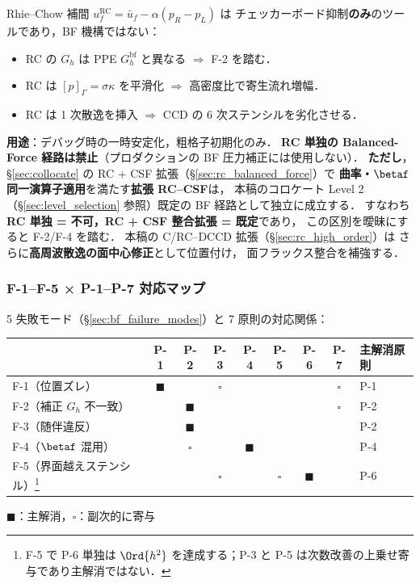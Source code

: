 Rhie--Chow 補間 $u_f^\text{RC}=\bar u_f - \alpha(p_R-p_L)$ は
チェッカーボード抑制\textbf{のみ}のツールであり，BF 機構ではない：
\begin{itemize}[noitemsep]
  \item RC の $G_h$ は PPE $G_h^\text{bf}$ と異なる $\Rightarrow$ F-2 を踏む．
  \item RC は $[p]_\Gamma=\sigma\kappa$ を平滑化 $\Rightarrow$ 高密度比で寄生流れ増幅．
  \item RC は 1 次散逸を挿入 $\Rightarrow$ CCD の 6 次ステンシルを劣化させる．
\end{itemize}
\textbf{用途}：デバッグ時の一時安定化，粗格子初期化のみ．
\textbf{RC 単独の Balanced-Force 経路は禁止}（プロダクションの BF 圧力補正には使用しない）．
\textbf{ただし}，§\ref{sec:collocate} の RC + CSF 拡張（§\ref{sec:rc_balanced_force}）で
\textbf{曲率・$\betaf$ 同一演算子適用}を満たす\textbf{拡張 RC--CSF}は，
本稿のコロケート Level 2（\S\ref{sec:level_selection} 参照）既定の BF 経路として独立に成立する．
すなわち\textbf{RC 単独 = 不可，RC + CSF 整合拡張 = 既定}であり，
この区別を曖昧にすると F-2/F-4 を踏む．
本稿の C/RC--DCCD 拡張（§\ref{sec:rc_high_order}）は
さらに\textbf{高周波散逸の面中心修正}として位置付け，
面フラックス整合を補強する．

\subsubsection{F-1--F-5 × P-1--P-7 対応マップ}
\label{sec:bf_failure_principle_map}

5 失敗モード（§\ref{sec:bf_failure_modes}）と 7 原則の対応関係：
\begin{center}
\renewcommand{\arraystretch}{1.2}
\begin{tabular}{@{}lcccccccl@{}}
\hline
 & P-1 & P-2 & P-3 & P-4 & P-5 & P-6 & P-7 & 主解消原則 \\
\hline
F-1（位置ズレ）              & $\blacksquare$ & & $\square$ & & & & $\square$ & P-1 \\
F-2（補正 $G_h$ 不一致）      & & $\blacksquare$ & & & & & $\square$ & P-2 \\
F-3（随伴違反）              & & $\blacksquare$ & & & & & & P-2 \\
F-4（$\betaf$ 混用）         & & $\square$ & & $\blacksquare$ & & & & P-4 \\
F-5（界面越えステンシル）\footnote{F-5 で P-6 単独は \(\Ord{h^2}\) を達成する；P-3 と P-5 は次数改善の上乗せ寄与であり主解消ではない．}   & & & $\square$ & & $\square$ & $\blacksquare$ & & P-6 \\
\hline
\end{tabular}

{\footnotesize $\blacksquare$：主解消，$\square$：副次的に寄与}
\end{center}

